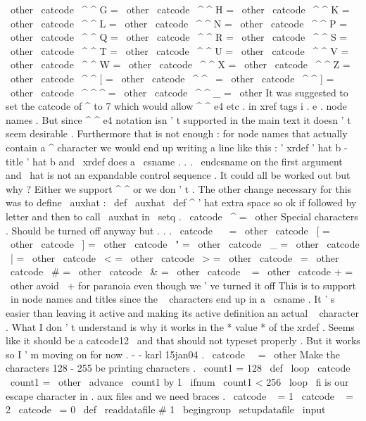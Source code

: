 {{{\
other
\
catcode
\
^
^
G
=
\
other
\
catcode
\
^
^
H
=
\
other
\
catcode
\
^
^
K
=
\
other
\
catcode
\
^
^
L
=
\
other
\
catcode
\
^
^
N
=
\
other
\
catcode
\
^
^
P
=
\
other
\
catcode
\
^
^
Q
=
\
other
\
catcode
\
^
^
R
=
\
other
\
catcode
\
^
^
S
=
\
other
\
catcode
\
^
^
T
=
\
other
\
catcode
\
^
^
U
=
\
other
\
catcode
\
^
^
V
=
\
other
\
catcode
\
^
^
W
=
\
other
\
catcode
\
^
^
X
=
\
other
\
catcode
\
^
^
Z
=
\
other
\
catcode
\
^
^
[
=
\
other
\
catcode
\
^
^
\
=
\
other
\
catcode
\
^
^
]
=
\
other
\
catcode
\
^
^
^
=
\
other
\
catcode
\
^
^
_
=
\
other
%
It
was
suggested
to
set
the
catcode
of
^
to
7
which
would
allow
^
^
e4
etc
.
%
in
xref
tags
i
.
e
.
node
names
.
But
since
^
^
e4
notation
isn
'
t
%
supported
in
the
main
text
it
doesn
'
t
seem
desirable
.
Furthermore
%
that
is
not
enough
:
for
node
names
that
actually
contain
a
^
%
character
we
would
end
up
writing
a
line
like
this
:
'
xrdef
{
'
hat
%
b
-
title
}
{
'
hat
b
}
and
\
xrdef
does
a
\
csname
.
.
.
\
endcsname
on
the
first
%
argument
and
\
hat
is
not
an
expandable
control
sequence
.
It
could
%
all
be
worked
out
but
why
?
Either
we
support
^
^
or
we
don
'
t
.
%
%
The
other
change
necessary
for
this
was
to
define
\
auxhat
:
%
\
def
\
auxhat
{
\
def
^
{
'
hat
}
}
%
extra
space
so
ok
if
followed
by
letter
%
and
then
to
call
\
auxhat
in
\
setq
.
%
\
catcode
\
^
=
\
other
%
%
Special
characters
.
Should
be
turned
off
anyway
but
.
.
.
\
catcode
\
~
=
\
other
\
catcode
\
[
=
\
other
\
catcode
\
]
=
\
other
\
catcode
\
"
=
\
other
\
catcode
\
_
=
\
other
\
catcode
\
|
=
\
other
\
catcode
\
<
=
\
other
\
catcode
\
>
=
\
other
\
catcode
\
=
\
other
\
catcode
\
#
=
\
other
\
catcode
\
&
=
\
other
\
catcode
\
%
=
\
other
\
catcode
+
=
\
other
%
avoid
\
+
for
paranoia
even
though
we
'
ve
turned
it
off
%
%
This
is
to
support
\
in
node
names
and
titles
since
the
\
%
characters
end
up
in
a
\
csname
.
It
'
s
easier
than
%
leaving
it
active
and
making
its
active
definition
an
actual
\
%
character
.
What
I
don
'
t
understand
is
why
it
works
in
the
*
value
*
%
of
the
xrdef
.
Seems
like
it
should
be
a
catcode12
\
and
that
%
should
not
typeset
properly
.
But
it
works
so
I
'
m
moving
on
for
%
now
.
-
-
karl
15jan04
.
\
catcode
\
\
=
\
other
%
%
Make
the
characters
128
-
255
be
printing
characters
.
{
%
\
count1
=
128
\
def
\
loop
{
%
\
catcode
\
count1
=
\
other
\
advance
\
count1
by
1
\
ifnum
\
count1
<
256
\
loop
\
fi
}
%
}
%
%
%
is
our
escape
character
in
.
aux
files
and
we
need
braces
.
\
catcode
\
{
=
1
\
catcode
\
}
=
2
\
catcode
\
=
0
}
\
def
\
readdatafile
#
1
{
%
\
begingroup
\
setupdatafile
\
input
}}}
